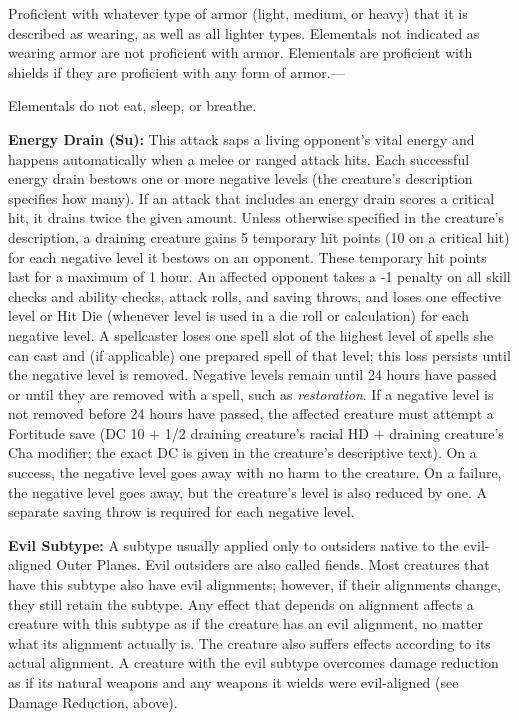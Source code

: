 \documentclass{article}
\begin{document}
Proficient with whatever type of armor (light, medium, or heavy) that it is described 
as wearing, as well as all lighter types. Elementals not indicated as wearing armor 
are not proficient with armor. Elementals are proficient with shields if they are 
proficient with any form of armor.---

Elementals do not eat, sleep, or breathe.

\vspace{12pt}
\textbf{Energy Drain (Su):} This attack saps a living opponent's vital energy and 
happens automatically when a melee or ranged attack hits. Each successful energy 
drain bestows one or more negative levels (the creature's description specifies 
how many). If an attack that includes an energy drain scores a critical hit, it 
drains twice the given amount. Unless otherwise specified in the creature's description, 
a draining creature gains 5 temporary hit points (10 on a critical hit) for each 
negative level it bestows on an opponent. These temporary hit points last for a 
maximum of 1 hour. An affected opponent takes a -1 penalty on all skill checks 
and ability checks, attack rolls, and saving throws, and loses one effective level 
or Hit Die (whenever level is used in a die roll or calculation) for each negative 
level. A spellcaster loses one spell slot of the highest level of spells she can 
cast and (if applicable) one prepared spell of that level; this loss persists until 
the negative level is removed. Negative levels remain until 24 hours have passed 
or until they are removed with a spell, such as \textit{restoration}. If a negative 
level is not removed before 24 hours have passed, the affected creature must attempt 
a Fortitude save (DC 10 + 1/2 draining creature's racial HD + draining creature's 
Cha modifier; the exact DC is given in the creature's descriptive text). On a success, 
the negative level goes away with no harm to the creature. On a failure, the negative 
level goes away, but the creature's level is also reduced by one. A separate saving 
throw is required for each negative level.

\vspace{12pt}
\textbf{Evil Subtype: }A subtype usually applied only to outsiders native to the 
evil-aligned Outer Planes. Evil outsiders are also called fiends. Most creatures 
that have this subtype also have evil alignments; however, if their alignments 
change, they still retain the subtype. Any effect that depends on alignment affects 
a creature with this subtype as if the creature has an evil alignment, no matter 
what its alignment actually is. The creature also suffers effects according to 
its actual alignment. A creature with the evil subtype overcomes damage reduction 
as if its natural weapons and any weapons it wields were evil-aligned (see Damage 
Reduction, above).
\end{document}
